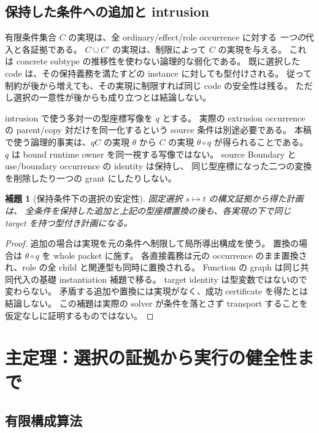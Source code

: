 \documentclass[11pt,a4paper]{article}
\newtheorem{lemma}[definition]{補題}
\begin{document}
\subsection{保持した条件への追加と intrusion}

有限条件集合 \(C\) の実現は、全 ordinary/effect/role occurrence に対する
\emph{一つの}代入と各証拠である。
\(C\cup C'\) の実現は、制限によって \(C\) の実現を与える。
これは concrete subtype の推移性を使わない論理的な弱化である。
既に選択した code は、その保持義務を満たすどの instance に対しても型付けされる。
従って制約が後から増えても、その実現に制限すれば同じ code の安全性は残る。
ただし選択の一意性が後からも成り立つとは結論しない。

intrusion で使う多対一の型座標写像を \(q\) とする。
実際の extrusion occurrence の parent/copy 対だけを同一化するという source 条件は別途必要である。
本稿で使う論理的事実は、\(qC\) の実現 \(\theta\) から
\(C\) の実現 \(\theta\circ q\) が得られることである。
\(q\) は bound runtime owner を同一視する写像ではない。
source Boundary と use/boundary occurrence の identity は保持し、
同じ型座標になった二つの変換を削除したり一つの grant にしたりしない。

\begin{lemma}[保持条件下の選択の安定性]
固定選択 \(s\mapsto t\) の構文証拠から得た計画は、
全条件を保持した追加と上記の型座標置換の後も、各実現の下で同じ target を持つ型付き計画になる。
\end{lemma}
\begin{proof}
追加の場合は実現を元の条件へ制限して局所導出構成を使う。
置換の場合は \(\theta\circ q\) を whole packet に施す。
各直接義務は元の occurrence のまま置換され、role の全 child と関連型も同時に置換される。
Function の graph は同じ共同代入の基礎 instantiation 補題で移る。
target identity は型変数ではないので変わらない。
矛盾する追加や置換には実現がなく、成功 certificate を得たとは結論しない。
この補題は実際の solver が条件を落とさず transport することを仮定なしに証明するものではない。
\end{proof}

\section{主定理：選択の証拠から実行の健全性まで}
\label{sec:main}

\subsection{有限構成算法}
\end{document}
